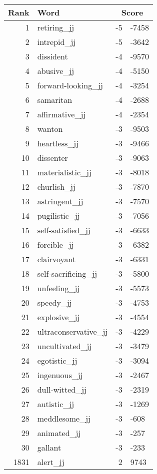 \begin{longtable}[!htbp]{| rlr@{.}l |}
    \hline
    \textbf{Rank} & \textbf{Word} & \multicolumn{2}{c|}{\textbf{Score}} \\
    \hline
    \endhead
    1 & retiring\_jj & -5 & -7458 \\
    2 & intrepid\_jj & -5 & -3642 \\
    3 & dissident & -4 & -9570 \\
    4 & abusive\_jj & -4 & -5150 \\
    5 & forward-looking\_jj & -4 & -3254 \\
    6 & samaritan & -4 & -2688 \\
    7 & affirmative\_jj & -4 & -2354 \\
    8 & wanton & -3 & -9503 \\
    9 & heartless\_jj & -3 & -9466 \\
    10 & dissenter & -3 & -9063 \\
    11 & materialistic\_jj & -3 & -8018 \\
    12 & churlish\_jj & -3 & -7870 \\
    13 & astringent\_jj & -3 & -7570 \\
    14 & pugilistic\_jj & -3 & -7056 \\
    15 & self-satisfied\_jj & -3 & -6633 \\
    16 & forcible\_jj & -3 & -6382 \\
    17 & clairvoyant & -3 & -6331 \\
    18 & self-sacrificing\_jj & -3 & -5800 \\
    19 & unfeeling\_jj & -3 & -5573 \\
    20 & speedy\_jj & -3 & -4753 \\
    21 & explosive\_jj & -3 & -4554 \\
    22 & ultraconservative\_jj & -3 & -4229 \\
    23 & uncultivated\_jj & -3 & -3479 \\
    24 & egotistic\_jj & -3 & -3094 \\
    25 & ingenuous\_jj & -3 & -2467 \\
    26 & dull-witted\_jj & -3 & -2319 \\
    27 & autistic\_jj & -3 & -1269 \\
    28 & meddlesome\_jj & -3 & -608 \\
    29 & animated\_jj & -3 & -257 \\
    30 & gallant & -3 & -233 \\
    1831 & alert\_jj & 2 & 9743 \\

\end{longtable}
